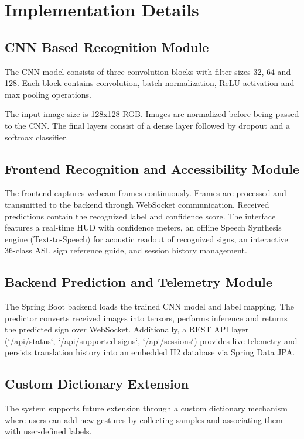 \documentclass[11pt,a4paper]{report}
\begin{document}
\section{Implementation Details}

\subsection{CNN Based Recognition Module}

The CNN model consists of three convolution blocks with filter sizes 32, 64 and 128. Each block contains convolution, batch normalization, ReLU activation and max pooling operations.

The input image size is 128x128 RGB. Images are normalized before being passed to the CNN. The final layers consist of a dense layer followed by dropout and a softmax classifier.

\subsection{Frontend Recognition and Accessibility Module}

The frontend captures webcam frames continuously. Frames are processed and transmitted to the backend through WebSocket communication. Received predictions contain the recognized label and confidence score. The interface features a real-time HUD with confidence meters, an offline Speech Synthesis engine (Text-to-Speech) for acoustic readout of recognized signs, an interactive 36-class ASL sign reference guide, and session history management.

\subsection{Backend Prediction and Telemetry Module}

The Spring Boot backend loads the trained CNN model and label mapping. The predictor converts received images into tensors, performs inference and returns the predicted sign over WebSocket. Additionally, a REST API layer (`/api/status`, `/api/supported-signs`, `/api/sessions`) provides live telemetry and persists translation history into an embedded H2 database via Spring Data JPA.

\subsection{Custom Dictionary Extension}

The system supports future extension through a custom dictionary mechanism where users can add new gestures by collecting samples and associating them with user-defined labels.
\end{document}

